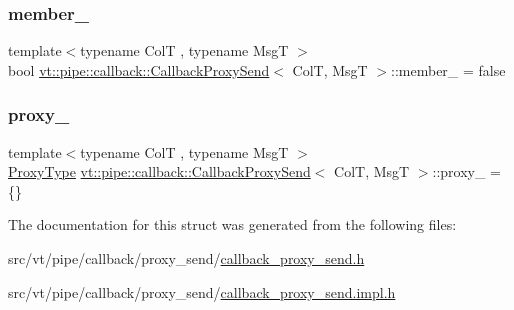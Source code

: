 \subsubsection{\texorpdfstring{member\+\_\+}{member\_}}
{\footnotesize\ttfamily template$<$typename ColT , typename MsgT $>$ \\
bool \hyperlink{structvt_1_1pipe_1_1callback_1_1_callback_proxy_send}{vt\+::pipe\+::callback\+::\+Callback\+Proxy\+Send}$<$ ColT, MsgT $>$\+::member\+\_\+ = false\hspace{0.3cm}{\ttfamily [private]}}

\mbox{\label{structvt_1_1pipe_1_1callback_1_1_callback_proxy_send_a324fc5697bd625cf1a3f8961855886d9}} 
\subsubsection{\texorpdfstring{proxy\+\_\+}{proxy\_}}
{\footnotesize\ttfamily template$<$typename ColT , typename MsgT $>$ \\
\hyperlink{structvt_1_1pipe_1_1callback_1_1_callback_proxy_send_a2aece7c6f8bd17a4c0b1fdca75d84579}{Proxy\+Type} \hyperlink{structvt_1_1pipe_1_1callback_1_1_callback_proxy_send}{vt\+::pipe\+::callback\+::\+Callback\+Proxy\+Send}$<$ ColT, MsgT $>$\+::proxy\+\_\+ = \{\}\hspace{0.3cm}{\ttfamily [private]}}



The documentation for this struct was generated from the following files\+:\begin{DoxyCompactItemize}
\item 
src/vt/pipe/callback/proxy\+\_\+send/\hyperlink{callback__proxy__send_8h}{callback\+\_\+proxy\+\_\+send.\+h}\item 
src/vt/pipe/callback/proxy\+\_\+send/\hyperlink{callback__proxy__send_8impl_8h}{callback\+\_\+proxy\+\_\+send.\+impl.\+h}\end{DoxyCompactItemize}
